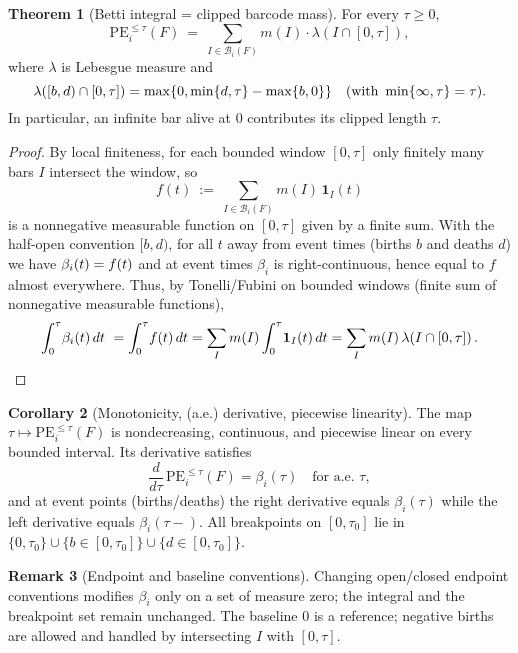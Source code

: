\documentclass[11pt]{article}
\numberwithin{equation}{section}
\theoremstyle{plain}
\theoremstyle{definition}
\theoremstyle{remark}
\theoremstyle{plain}
\theoremstyle{definition}
\numberwithin{equation}{section}
\newtheorem{theorem}{Theorem}[section]
\newtheorem{corollary}[theorem]{Corollary}
\theoremstyle{definition}
\newtheorem{remark}[theorem]{Remark}
\numberwithin{equation}{section}
\theoremstyle{plain}
\theoremstyle{definition}
\theoremstyle{remark}
\providecommand{\n}{\unskip\space}
\begin{document}
\begin{theorem}[Betti integral = clipped barcode mass]\label{H:thm:betti-integral}
For every $\tau\ge 0$,
\[
\mathrm{PE}_i^{\le \tau}(F)\ =\ \sum_{I\in \mathcal{B}_i(F)} m(I)\cdot \lambda\!\left(I\cap[0,\tau]\right),
\]
where $\lambda$ is Lebesgue measure and
\[
\lambda([b,d)\cap[0,\tau])=\max\{0,\min\{d,\tau\}-\max\{b,0\}\}\n\quad(\text{with }\min\{\infty,\tau\}=\tau).
\]
In particular, an infinite bar alive at $0$ contributes its clipped length $\tau$.
\end{theorem}

\begin{proof}
By local finiteness, for each bounded window $[0,\tau]$ only finitely many bars $I$ intersect the window, so
\[
f(t)\ :=\ \sum_{I\in\mathcal{B}_i(F)} m(I)\,\mathbf{1}_I(t)
\]
is a nonnegative measurable function on $[0,\tau]$ given by a finite sum. With the half-open convention $[b,d)$, for all $t$ away from event times (births $b$ and deaths $d$) we have
\(\n\beta_i(t)=f(t)\n\)
and at event times $\beta_i$ is right-continuous, hence equal to $f$ almost everywhere.
Thus, by Tonelli/Fubini on bounded windows (finite sum of nonnegative measurable functions),
\[
\int_{0}^{\tau}\!\beta_i(t)\,dt\ =\int_{0}^{\tau}\!f(t)\,dt\n=\sum_{I} m(I)\int_{0}^{\tau}\!\mathbf{1}_{I}(t)\,dt\n=\sum_{I} m(I)\,\lambda\!\left(I\cap[0,\tau]\right).
\]
\end{proof}

\begin{corollary}[Monotonicity, (a.e.) derivative, piecewise linearity]\label{H:cor:pl}
The map $\tau\mapsto \mathrm{PE}_i^{\le \tau}(F)$ is nondecreasing, continuous, and piecewise linear on every bounded interval. Its derivative satisfies
\[
\frac{d}{d\tau}\,\mathrm{PE}_i^{\le \tau}(F)=\beta_i(\tau)\quad\text{for a.e.\ }\tau,
\]
and at event points (births/deaths) the right derivative equals $\beta_i(\tau)$ while the left derivative equals $\beta_i(\tau-)$. All breakpoints on $[0,\tau_0]$ lie in $\{0,\tau_0\}\cup\{b\in[0,\tau_0]\}\cup\{d\in[0,\tau_0]\}$.
\end{corollary}

\begin{remark}[Endpoint and baseline conventions]\label{H:rk:endpoints}
Changing open/closed endpoint conventions modifies $\beta_i$ only on a set of measure zero; the integral and the breakpoint set remain unchanged. The baseline $0$ is a reference; negative births are allowed and handled by intersecting $I$ with $[0,\tau]$.
\end{remark}
\end{document}
